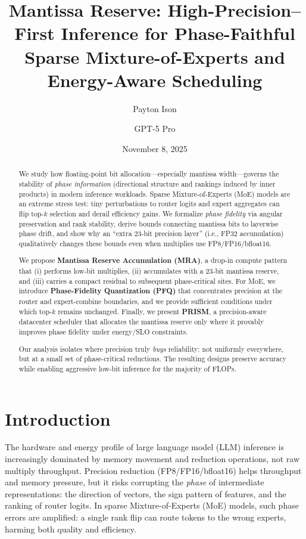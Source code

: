 \documentclass[11pt]{article}
\title{\bf Mantissa Reserve: High-Precision--First Inference for Phase-Faithful Sparse Mixture-of-Experts and Energy-Aware Scheduling}
\author{Payton Ison \and GPT-5 Pro}
\date{November 8, 2025}
\theoremstyle{plain}
\theoremstyle{definition}
\begin{document}
\maketitle

\begin{abstract}
We study how floating-point bit allocation---especially mantissa width---governs the stability of \emph{phase information} (directional structure and rankings induced by inner products) in modern inference workloads. Sparse Mixture-of-Experts (MoE) models are an extreme stress test: tiny perturbations to router logits and expert aggregates can flip top-$k$ selection and derail efficiency gains. We formalize \emph{phase fidelity} via angular preservation and rank stability, derive bounds connecting mantissa bits to layerwise phase drift, and show why an ``extra $23$-bit precision layer'' (i.e., FP32 accumulation) qualitatively changes these bounds even when multiplies use FP8/FP16/bfloat16.

We propose \textbf{Mantissa Reserve Accumulation (MRA)}, a drop-in compute pattern that (i) performs low-bit multiplies, (ii) accumulates with a $23$-bit mantissa reserve, and (iii) carries a compact residual to subsequent phase-critical sites. For MoE, we introduce \textbf{Phase-Fidelity Quantization (PFQ)} that concentrates precision at the router and expert-combine boundaries, and we provide sufficient conditions under which top-$k$ remains unchanged. Finally, we present \textbf{PRISM}, a precision-aware datacenter scheduler that allocates the mantissa reserve only where it provably improves phase fidelity under energy/SLO constraints.

Our analysis isolates where precision truly \emph{buys} reliability: not uniformly everywhere, but at a small set of phase-critical reductions. The resulting designs preserve accuracy while enabling aggressive low-bit inference for the majority of FLOPs.
\end{abstract}

\section{Introduction}

The hardware and energy profile of large language model (LLM) inference is increasingly dominated by memory movement and reduction operations, not raw multiply throughput. Precision reduction (FP8/FP16/bfloat16) helps throughput and memory pressure, but it risks corrupting the \emph{phase} of intermediate representations: the direction of vectors, the sign pattern of features, and the ranking of router logits. In sparse Mixture-of-Experts (MoE) models, such phase errors are amplified: a single rank flip can route tokens to the wrong experts, harming both quality and efficiency.
\end{document}

